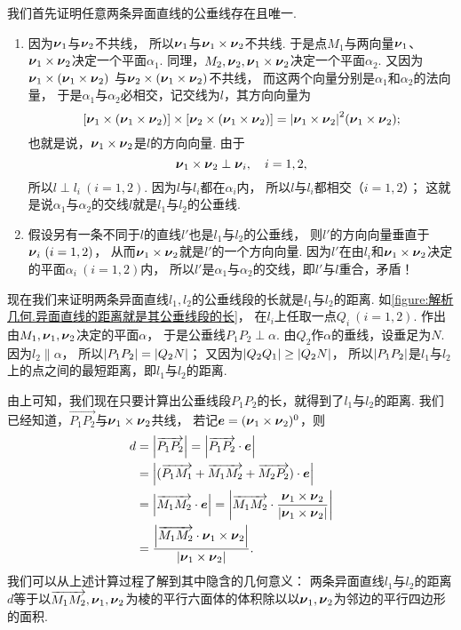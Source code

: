 我们首先证明任意两条异面直线的公垂线存在且唯一.
\begin{enumerate}
	\item 因为\(\boldsymbol{\nu}_1\)与\(\boldsymbol{\nu}_2\)不共线，
	所以\(\boldsymbol{\nu}_1\)与\(\boldsymbol{\nu}_1\times\boldsymbol{\nu}_2\)不共线.
	于是点\(M_1\)与两向量\(\boldsymbol{\nu}_1\)、\(\boldsymbol{\nu}_1\times\boldsymbol{\nu}_2\)决定一个平面\(\alpha_1\).
	同理，\(M_2,\boldsymbol{\nu}_2,\boldsymbol{\nu}_1\times\boldsymbol{\nu}_2\)决定一个平面\(\alpha_2\).
	又因为\(\boldsymbol{\nu}_1\times(\boldsymbol{\nu}_1\times\boldsymbol{\nu}_2)\)
	与\(\boldsymbol{\nu}_2\times(\boldsymbol{\nu}_1\times\boldsymbol{\nu}_2)\)不共线，
	而这两个向量分别是\(\alpha_1\)和\(\alpha_2\)的法向量，
	于是\(\alpha_1\)与\(\alpha_2\)必相交，记交线为\(l\)，其方向向量为\[
		[\boldsymbol{\nu}_1\times(\boldsymbol{\nu}_1\times\boldsymbol{\nu}_2)]
		\times[\boldsymbol{\nu}_2\times(\boldsymbol{\nu}_1\times\boldsymbol{\nu}_2)]
		= \abs{\boldsymbol{\nu}_1\times\boldsymbol{\nu}_2}^2(\boldsymbol{\nu}_1\times\boldsymbol{\nu}_2);
	\]
	也就是说，\(\boldsymbol{\nu}_1\times\boldsymbol{\nu}_2\)是\(l\)的方向向量.
	由于\[
		\boldsymbol{\nu}_1\times\boldsymbol{\nu}_2 \perp \boldsymbol{\nu}_i,
		\quad i=1,2,
	\]
	所以\(l \perp l_i\ (i=1,2)\).
	因为\(l\)与\(l_i\)都在\(\alpha_i\)内，
	所以\(l\)与\(l_i\)都相交（\(i=1,2\)）；
	这就是说\(\alpha_1\)与\(\alpha_2\)的交线\(l\)就是\(l_1\)与\(l_2\)的公垂线.

	\item 假设另有一条不同于\(l\)的直线\(l'\)也是\(l_1\)与\(l_2\)的公垂线，
	则\(l'\)的方向向量垂直于\(\boldsymbol{\nu}_i\ (i=1,2)\)，
	从而\(\boldsymbol{\nu}_1\times\boldsymbol{\nu}_2\)就是\(l'\)的一个方向向量.
	因为\(l'\)在由\(l_i\)和\(\boldsymbol{\nu}_1\times\boldsymbol{\nu}_2\)决定的平面\(\alpha_i\ (i=1,2)\)内，
	所以\(l'\)是\(\alpha_1\)与\(\alpha_2\)的交线，即\(l'\)与\(l\)重合，矛盾！
\end{enumerate}

现在我们来证明两条异面直线\(l_1,l_2\)的公垂线段的长就是\(l_1\)与\(l_2\)的距离.
如\cref{figure:解析几何.异面直线的距离就是其公垂线段的长}，
在\(l_i\)上任取一点\(Q_i\ (i=1,2)\).
作出由\(M_1,\boldsymbol{\nu}_1,\boldsymbol{\nu}_2\)决定的平面\(\alpha\)，
于是公垂线\(P_1 P_2 \perp \alpha\).
由\(Q_2\)作\(\alpha\)的垂线，设垂足为\(N\).
因为\(l_2 \parallel \alpha\)，
所以\(\abs{P_1 P_2} = \abs{Q_2 N}\)；
又因为\(\abs{Q_2 Q_1} \geq \abs{Q_2 N}\)，
所以\(\abs{P_1 P_2}\)是\(l_1\)与\(l_2\)上的点之间的最短距离，即\(l_1\)与\(l_2\)的距离.

由上可知，我们现在只要计算出公垂线段\(P_1 P_2\)的长，就得到了\(l_1\)与\(l_2\)的距离.
我们已经知道，\(\vec{P_1 P_2}\)与\(\boldsymbol{\nu}_1\times\boldsymbol{\nu}_2\)共线，
若记\(\boldsymbol{e} = (\boldsymbol{\nu}_1\times\boldsymbol{\nu}_2)^0\)，则\begin{align*}
	d &= \abs{\overrightarrow{P_1 P_2}}
	= \abs{\overrightarrow{P_1 P_2} \cdot \boldsymbol{e}} \\
	&= \abs{(\overrightarrow{P_1 M_1} + \overrightarrow{M_1 M_2} + \overrightarrow{M_2 P_2}) \cdot \boldsymbol{e}} \\
	&= \abs{\overrightarrow{M_1 M_2} \cdot \boldsymbol{e}}
	= \abs{\overrightarrow{M_1 M_2} \cdot \frac{\boldsymbol{\nu}_1\times\boldsymbol{\nu}_2}{\abs{\boldsymbol{\nu}_1\times\boldsymbol{\nu}_2}}} \\
	&= \frac{\abs{\overrightarrow{M_1 M_2} \cdot \boldsymbol{\nu}_1\times\boldsymbol{\nu}_2}}{\abs{\boldsymbol{\nu}_1\times\boldsymbol{\nu}_2}}.
\end{align*}
我们可以从上述计算过程了解到其中隐含的几何意义：
两条异面直线\(l_1\)与\(l_2\)的距离\(d\)等于以\(\overrightarrow{M_1 M_2},\boldsymbol{\nu}_1,\boldsymbol{\nu}_2\)为棱的平行六面体的体积除以以\(\boldsymbol{\nu}_1,\boldsymbol{\nu}_2\)为邻边的平行四边形的面积.

